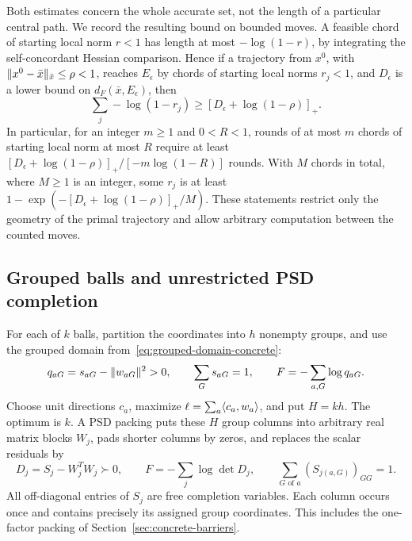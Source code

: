 Both estimates concern the whole accurate set, not the length of a
particular central path.  We record the resulting bound on bounded moves.  A feasible chord of starting
local norm $r<1$ has length at most $-\log(1-r)$, by integrating the
self-concordant Hessian comparison.  Hence if a trajectory from $x^0$,
with $\lVert x^0-\bar x\rVert_{\bar x}\leq\rho<1$, reaches $E_\epsilon$ by
chords of starting local norms $r_j<1$, and $D_\epsilon$ is a lower
bound on $d_F(\bar x,E_\epsilon)$, then
\begin{equation}\label{eq:cm-movement-budget}
 \sum_j-\log(1-r_j)\geq
 [D_\epsilon+\log(1-\rho)]_+.
\end{equation}
In particular, for an integer $m\geq1$ and $0<R<1$, rounds of at most
$m$ chords of starting local norm at most $R$ require at least $[D_\epsilon+\log(1-\rho)]_+/[-m\log(1-R)]$ rounds.
With $M$ chords in total, where $M\geq1$ is an
integer, some $r_j$ is at least
$1-\exp(-[D_\epsilon+\log(1-\rho)]_+/M)$.
These statements restrict only the geometry of the primal trajectory
and allow arbitrary computation between the counted moves.

\subsection{Grouped balls and unrestricted PSD completion}

For each of $k$ balls, partition the coordinates into $h$ nonempty groups,
and use the grouped domain from~\eqref{eq:grouped-domain-concrete}:
\[
 q_{aG}=s_{aG}-\lVert w_{aG}\rVert^2>0,\qquad
 \sum_Gs_{aG}=1,\qquad F=-\sum_{a,G}\log q_{aG}.
\]
Choose unit directions $c_a$, maximize
$\ell=\sum_a\langle c_a,w_a\rangle$, and put $H=kh$.
The optimum is $k$.  A PSD packing puts these $H$ group columns into
arbitrary real matrix blocks $W_j$, pads shorter columns by zeros, and
replaces the scalar residuals by
\[
 D_j=S_j-W_j^TW_j\succ0,\qquad F=-\sum_j\log\det D_j,
 \qquad \sum_{G\text{ of }a}(S_{j(a,G)})_{GG}=1.
\]
All off-diagonal entries of $S_j$ are free completion variables.  Each column occurs once
and contains precisely its assigned group coordinates.  This includes
the one-factor packing of Section~\ref{sec:concrete-barriers}.

